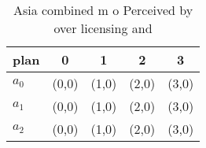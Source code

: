 \documentclass[a4paper]{article}
\begin{document}
\begin{table}
\begin{adjustbox}{width=0.6\columnwidth}
\begin{tabular}{|l|l|l|l|l|}
\hline
\textbf{plan} & \multicolumn{1}{c|}{\textbf{0}} & \multicolumn{1}{c|}{\textbf{1}} & \multicolumn{1}{c|}{\textbf{2}} & \multicolumn{1}{c|}{\textbf{3}} \\ \hline
\textbf{$a_0$}  & (0,0) & (1,0) & (2,0) & (3,0) \\ \hline
\textbf{$a_1$}  & (0,0) & (1,0) & (2,0) & (3,0) \\ \hline
\textbf{$a_2$}  & (0,0) & (1,0) & (2,0) & (3,0) \\ \hline
\end{tabular}
\end{adjustbox}
\caption{Asia combined m o Perceived by over licensing and
}
\end{table}
\end{document}
